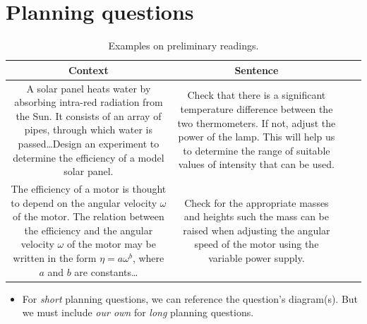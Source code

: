 \documentclass[oneside]{book}
\begin{document}
\section{Planning questions}
\begin{table}[H]
    \centering
    \begin{tabular}{|Sc|Sc|}
        \hline
        Context & Sentence\\
        \hline
        \begin{minipage}{0.5\textwidth-25.2pt}
            A solar panel heats water by absorbing intra-red radiation from the Sun. It consists of an array of pipes, through which water is passed\dots Design an experiment to determine the efficiency of a model solar panel.
        \end{minipage}&
        \begin{minipage}{0.5\textwidth-25.2pt}
            Check that there is a significant temperature difference between the two thermometers. If not, adjust the power of the lamp. This will help us to determine the range of suitable values of intensity that can be used.
        \end{minipage}\\
        \hline
        \begin{minipage}{0.5\textwidth-25.2pt}
            The efficiency of a motor is thought to depend on the angular velocity \(\omega\) of the motor. The relation between the efficiency and the angular velocity \(\omega\) of the motor may be written in the form \(\eta=a\omega^b\), where \(a\) and \(b\) are constants\dots
        \end{minipage}&
        \begin{minipage}{0.5\textwidth-25.2pt}
            Check for the appropriate masses and heights such the mass can be raised when adjusting the angular speed of the motor using the variable power supply.
        \end{minipage}\\
        \hline
    \end{tabular}
    \caption{Examples on preliminary readings.}
    \label{table:preliminary-readings}
\end{table}
\begin{itemize}
    \item For \emph{short} planning questions, we can reference the question's diagram(s). But we must include \emph{our own} for \emph{long} planning questions.
\end{itemize}
\end{document}
